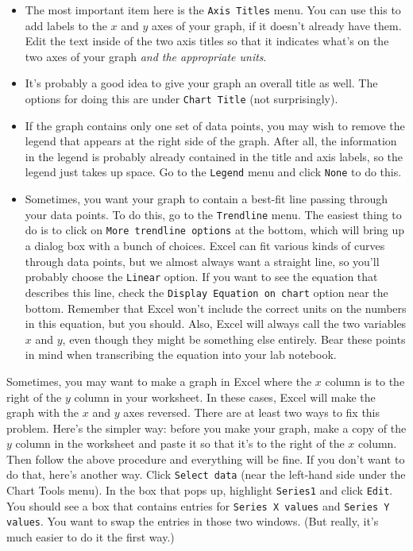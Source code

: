 \begin{itemize}
\item The most important item here is the {\tt Axis Titles} menu.
You can use this to add labels to the $x$ and $y$ axes of your graph,
if it doesn't already have them.  Edit the text inside of the two axis
titles so that it indicates what's on the two axes of your graph
{\it and the appropriate units}.
\item It's probably a good idea to give your graph an overall
title as well.  The options for doing this are under {\tt Chart Title} (not
surprisingly).
\item If the graph contains only one set of data
points, you may wish to remove the legend that appears at the right
side of the graph.  
After all, the information in the legend is probably already contained in the
title and axis labels, so the legend just takes up space.
Go to the {\tt Legend} menu and click {\tt None} to do this.
\item Sometimes, you want your graph to contain a best-fit line passing
through your data points.  To do this, go to the {\tt Trendline} menu.
The easiest thing to do is to click on {\tt More trendline options} at the
bottom, which will bring up a dialog box with a bunch of choices.
Excel can fit various kinds of curves through data points, but 
we almost always want a straight line, so you'll probably
choose the {\tt Linear} option.
If you want to see the equation that describes this line, check
the {\tt Display Equation on chart} option near the bottom.  Remember that
Excel won't include the correct units on the numbers in this equation,
but you should.  Also, Excel will always call the two variables $x$ and
$y$, even though they might be something else entirely.  Bear these
points in mind when transcribing the equation into your lab notebook.
\end{itemize}

Sometimes, you may want to make a graph in Excel where the $x$ column
is to the right of the $y$ column in your worksheet.  In these cases,
Excel will make the graph with the $x$ and $y$ axes reversed.  There
are at least two ways to fix this problem.  Here's the simpler way:
before you make your graph,  make
a copy of the $y$ column in the worksheet and paste it so that it's
to the right of the $x$ column.  Then follow the above procedure
and everything will be fine.
If you don't want to do that, here's
another way.  Click {\tt Select data} (near the left-hand side under
the Chart Tools menu).  In the box that pops up, highlight {\tt Series1}
and click {\tt Edit}.  You should see a box that contains entries
for {\tt Series X values} and {\tt Series Y values}.  You want to swap the 
entries in those two windows.  (But really, it's much easier
to do it the first way.)


